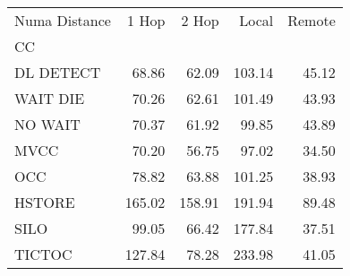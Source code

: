 \begin{tabular}{lrrrr}
\toprule
Numa Distance &  1 Hop &  2 Hop &  Local &  Remote \\
CC        &        &        &        &         \\
\midrule
DL DETECT &  68.86 &  62.09 & 103.14 &   45.12 \\
WAIT DIE  &  70.26 &  62.61 & 101.49 &   43.93 \\
NO WAIT   &  70.37 &  61.92 &  99.85 &   43.89 \\
MVCC      &  70.20 &  56.75 &  97.02 &   34.50 \\
OCC       &  78.82 &  63.88 & 101.25 &   38.93 \\
HSTORE    & 165.02 & 158.91 & 191.94 &   89.48 \\
SILO      &  99.05 &  66.42 & 177.84 &   37.51 \\
TICTOC    & 127.84 &  78.28 & 233.98 &   41.05 \\
\bottomrule
\end{tabular}
